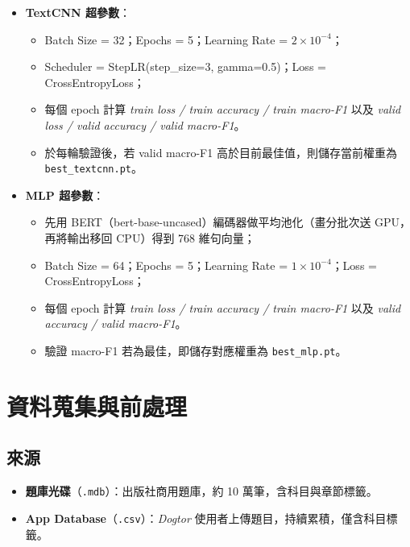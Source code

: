 \documentclass[10pt]{article}
\begin{document}
\begin{CJK}{UTF8}{bsmi}
\begin{itemize}
  \item \textbf{TextCNN 超參數}：
    \begin{itemize}
      \item Batch Size = 32；Epochs = 5；Learning Rate = $2\times10^{-4}$；  
      \item Scheduler = StepLR(step\_size=3, gamma=0.5)；Loss = CrossEntropyLoss；  
      \item 每個 epoch 計算 \textit{train loss / train accuracy / train macro-F1} 以及 \textit{valid loss / valid accuracy / valid macro-F1}。  
      \item 於每輪驗證後，若 valid macro-F1 高於目前最佳值，則儲存當前權重為 \texttt{best\_textcnn.pt}。  
    \end{itemize}

  \item \textbf{MLP 超參數}：
    \begin{itemize}
      \item 先用 BERT（bert-base-uncased）編碼器做平均池化（畫分批次送 GPU，再將輸出移回 CPU）得到 768 維句向量；  
      \item Batch Size = 64；Epochs = 5；Learning Rate = $1\times10^{-4}$；Loss = CrossEntropyLoss；  
      \item 每個 epoch 計算 \textit{train loss / train accuracy / train macro-F1} 以及 \textit{valid accuracy / valid macro-F1}。  
      \item 驗證 macro-F1 若為最佳，即儲存對應權重為 \texttt{best\_mlp.pt}。  
    \end{itemize}
\end{itemize}

\section{資料蒐集與前處理}

\subsection{來源}
\begin{itemize}[nosep]        %
  \item \textbf{題庫光碟}（\texttt{.mdb}）：出版社商用題庫，約 10 萬筆，含科目與章節標籤。
  \item \textbf{App Database}（\texttt{.csv}）：\textit{Dogtor} 使用者上傳題目，持續累積，僅含科目標籤。
\end{itemize}


\end{CJK}
\end{document}
